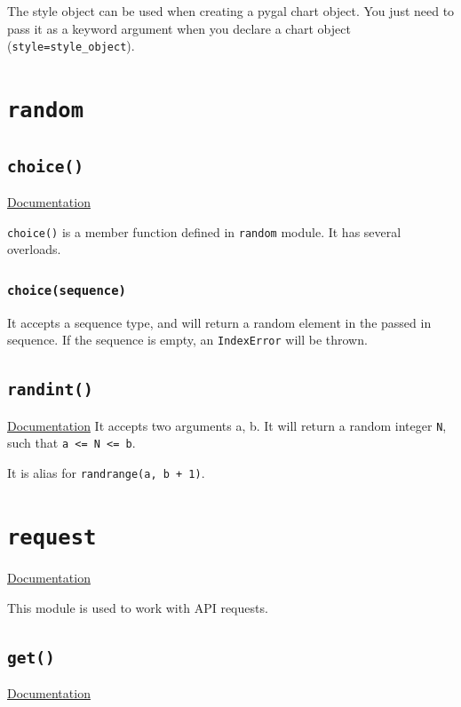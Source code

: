 \documentclass[12pt]{book}
\begin{document}
The style object can be used when creating a pygal chart object. You just need to pass it as a keyword argument when you declare a chart object (\texttt{style=style\_object}).

\chapter{\texttt{random}}
\label{sec:orgb4a2e20}
\section{\texttt{choice()}}
\label{sec:org17ea8ea}
\href{https://docs.python.org/3/library/random.html\#random.choice}{Documentation}

\texttt{choice()} is a member function defined in \texttt{random} module. It has several overloads.

\subsection{\texttt{choice(sequence)} \label{org653213f}}
\label{sec:orgfa0ff86}
It accepts a sequence type, and will return a random element in the passed in sequence. If the sequence is empty, an \texttt{IndexError} will be thrown.

\section{\texttt{randint()}}
\label{sec:org1a56091}
\href{https://docs.python.org/3/library/random.html\#random.randint}{Documentation}
It accepts two arguments a, b. It will return a random integer \texttt{N}, such that \texttt{a <= N <= b}.

It is alias for \texttt{randrange(a, b + 1)}.

\chapter{\texttt{request}}
\label{sec:org2a6461d}
\href{https://2.python-requests.org/en/master/}{Documentation}

This module is used to work with API requests.

\section{\texttt{get()}}
\label{sec:orgcf4a6a2}
\href{https://2.python-requests.org/en/master/api/\#requests.get}{Documentation}
\end{document}
